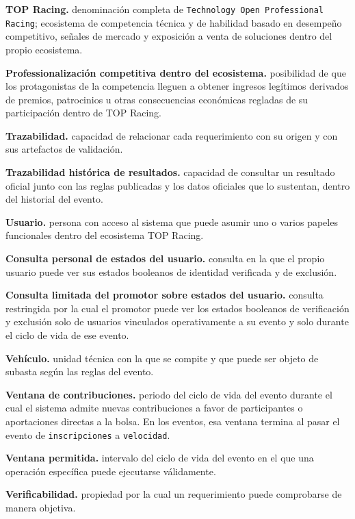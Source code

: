 \documentclass[10pt,letterpaper]{article}
\begin{document}
\noindent\textbf{TOP Racing.} denominación completa de \texttt{Technology Open Professional Racing}; ecosistema de competencia técnica y de habilidad basado en desempeño competitivo, señales de mercado y exposición a venta de soluciones dentro del propio ecosistema.\par
\noindent\textbf{Professionalización competitiva dentro del ecosistema.} posibilidad de que los protagonistas de la competencia lleguen a obtener ingresos legítimos derivados de premios, patrocinios u otras consecuencias económicas regladas de su participación dentro de TOP Racing.\par
\noindent\textbf{Trazabilidad.} capacidad de relacionar cada requerimiento con su origen y con sus artefactos de validación.\par
\noindent\textbf{Trazabilidad histórica de resultados.} capacidad de consultar un resultado oficial junto con las reglas publicadas y los datos oficiales que lo sustentan, dentro del historial del evento.\par
\noindent\textbf{Usuario.} persona con acceso al sistema que puede asumir uno o varios papeles funcionales dentro del ecosistema TOP Racing.\par
\noindent\textbf{Consulta personal de estados del usuario.} consulta en la que el propio usuario puede ver sus estados booleanos de identidad verificada y de exclusión.\par
\noindent\textbf{Consulta limitada del promotor sobre estados del usuario.} consulta restringida por la cual el promotor puede ver los estados booleanos de verificación y exclusión solo de usuarios vinculados operativamente a su evento y solo durante el ciclo de vida de ese evento.\par
\noindent\textbf{Vehículo.} unidad técnica con la que se compite y que puede ser objeto de subasta según las reglas del evento.\par
\noindent\textbf{Ventana de contribuciones.} periodo del ciclo de vida del evento durante el cual el sistema admite nuevas contribuciones a favor de participantes o aportaciones directas a la bolsa. En los eventos, esa ventana termina al pasar el evento de \texttt{inscripciones} a \texttt{velocidad}.\par
\noindent\textbf{Ventana permitida.} intervalo del ciclo de vida del evento en el que una operación específica puede ejecutarse válidamente.\par
\noindent\textbf{Verificabilidad.} propiedad por la cual un requerimiento puede comprobarse de manera objetiva.\par
\end{document}
